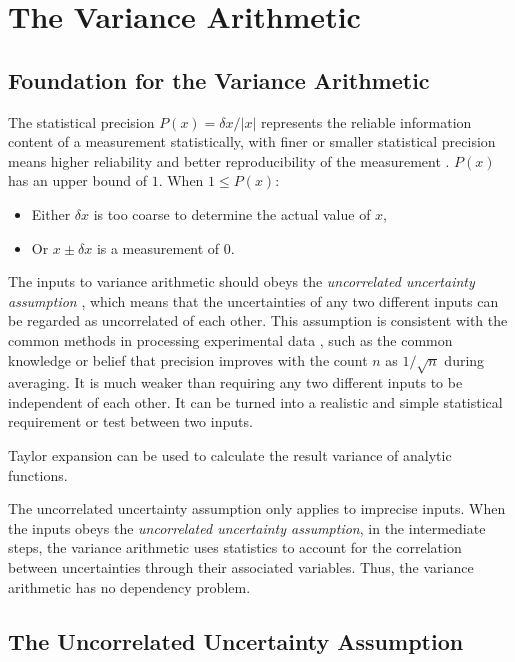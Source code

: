 \documentclass[twoside]{article}
\numberwithin{equation}{section}
\begin{document}
\clearpage
\section{The Variance Arithmetic}
\label{sec: variance arithmetic}


\subsection{Foundation for the Variance Arithmetic}

The statistical precision $P(x) = \delta x/|x|$ represents the reliable information content of a measurement statistically, with finer or smaller statistical precision means higher reliability and better reproducibility of the measurement \cite{Statistical_Methods}\cite{Precisions_Physical_Measurements}. 
$P(x)$ has an upper bound of $1$.
When $1 \leq P(x)$:
\begin{itemize}
\item Either $\delta x$ is too coarse to determine the actual value of $x$, 

\item Or $x \pm \delta x$ is a measurement of $0$.
\end{itemize}

The inputs to variance arithmetic should obeys the \emph{uncorrelated uncertainty assumption} \cite{Prev_Precision_Arithmetic}, which means that the uncertainties of any two different inputs can be regarded as uncorrelated of each other. 
This assumption is consistent with the common methods in processing experimental data \cite{Statistical_Methods}\cite{Precisions_Physical_Measurements}, such as the common knowledge or belief that precision improves with the count $n$ as $1 / \sqrt{n}$ during averaging.
It is much weaker than requiring any two different inputs to be independent of each other.
It can be turned into a realistic and simple statistical requirement or test between two inputs.

Taylor expansion can be used to calculate the result variance of analytic functions.

The uncorrelated uncertainty assumption only applies to imprecise inputs.
When the inputs obeys the \emph{uncorrelated uncertainty assumption}, in the intermediate steps, the variance arithmetic uses statistics to account for the correlation between uncertainties through their associated variables.
Thus, the variance arithmetic has no dependency problem.


\subsection{The Uncorrelated Uncertainty Assumption \cite{Prev_Precision_Arithmetic}}
\end{document}
